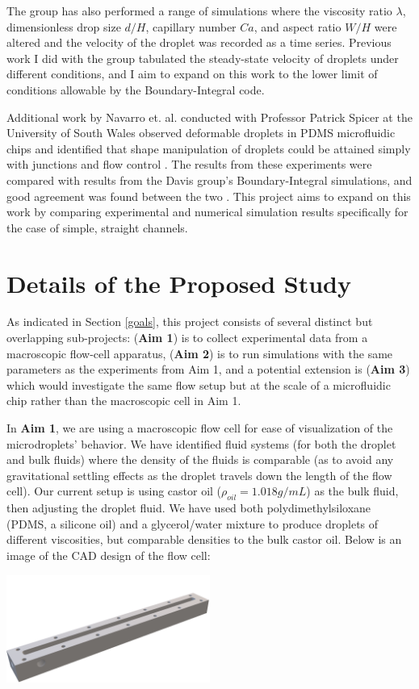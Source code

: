 \documentclass{article}
\begin{document}
The group has also performed a range of simulations where the viscosity ratio $\lambda$, dimensionless drop size $d/H$, capillary number $Ca$, and aspect ratio $W/H$ were altered and the velocity of the droplet was recorded as a time series. Previous work I did with the group tabulated the steady-state velocity of droplets under different conditions, and I aim to expand on this work to the lower limit of conditions allowable by the Boundary-Integral code. 

Additional work by Navarro et. al. conducted with Professor Patrick Spicer at the University of South Wales observed deformable droplets in PDMS microfluidic chips and identified that shape manipulation of droplets could be attained simply with junctions and flow control \cite{rociophd_thesis}. The results from these experiments were compared with results from the Davis group's Boundary-Integral simulations, and good agreement was found between the two \cite{rociophd_thesis}. This project aims to expand on this work by comparing experimental and numerical simulation results specifically for the case of simple, straight channels. 

\section{Details of the Proposed Study}
As indicated in Section \ref{goals}, this project consists of several distinct but overlapping sub-projects: (\textbf{Aim 1}) is to collect experimental data from a macroscopic flow-cell apparatus, (\textbf{Aim 2}) is to run simulations with the same parameters as the experiments from Aim 1, and a potential extension is (\textbf{Aim 3}) which would investigate the same flow setup but at the scale of a microfluidic chip rather than the macroscopic cell in Aim 1.

In \textbf{Aim 1}, we are using a macroscopic flow cell for ease of visualization of the microdroplets' behavior. We have identified fluid systems (for both the droplet and bulk fluids) where the density of the fluids is comparable (as to avoid any gravitational settling effects as the droplet travels down the length of the flow cell). Our current setup is using castor oil ($\rho_{oil} = 1.018 g/mL$) as the bulk fluid, then adjusting the droplet fluid. We have used both polydimethylsiloxane (PDMS, a silicone oil) and a glycerol/water mixture to produce droplets of different viscosities, but comparable densities to the bulk castor oil. Below is an image of the CAD design of the flow cell:
\begin{center}
\includegraphics[width=0.5\textwidth]{figures/flowcellCAD.png}
\end{center} 
\end{document}

